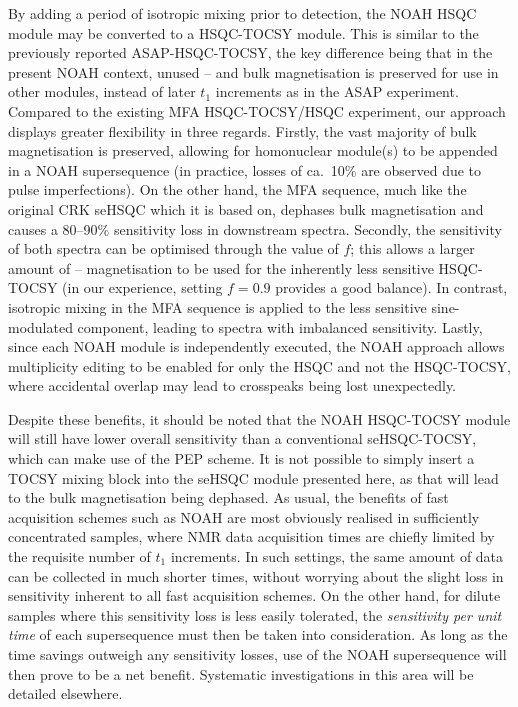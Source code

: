 \documentclass[11pt]{article}
\newcommand*{\carbon}{\ce{^{13}C}}
\newcommand*{\proton}{\ce{^{1}H}}
\begin{document}
By adding a period of isotropic mixing prior to detection, the NOAH HSQC module may be converted to a HSQC-TOCSY module.
This is similar to the previously reported ASAP-HSQC-TOCSY,\autocite{Becker2019JMR} the key difference being that in the present NOAH context, unused \carbon{}--\proton{} and bulk magnetisation is preserved for use in other modules, instead of later $t_1$ increments as in the ASAP experiment.
Compared to the existing MFA HSQC-TOCSY/HSQC experiment,\autocite{Nolis2019CPC} our approach displays greater flexibility in three regards.
Firstly, the vast majority of bulk magnetisation is preserved, allowing for homonuclear module(s) to be appended in a NOAH supersequence (in practice, losses of ca.\ 10\% are observed due to pulse imperfections).
On the other hand, the MFA sequence, much like the original CRK seHSQC which it is based on, dephases bulk magnetisation and causes a 80--90\% sensitivity loss in downstream spectra.
Secondly, the sensitivity of both spectra can be optimised through the value of $f$; this allows a larger amount of \carbon{}--\proton{} magnetisation to be used for the inherently less sensitive HSQC-TOCSY (in our experience, setting $f = 0.9$ provides a good balance).
In contrast, isotropic mixing in the MFA sequence is applied to the less sensitive sine-modulated component, leading to spectra with imbalanced sensitivity.
Lastly, since each NOAH module is independently executed, the NOAH approach allows multiplicity editing to be enabled for only the HSQC and not the HSQC-TOCSY, where accidental overlap may lead to crosspeaks being lost unexpectedly.

Despite these benefits, it should be noted that the NOAH HSQC-TOCSY module will still have lower overall sensitivity than a conventional seHSQC-TOCSY, which can make use of the PEP scheme.
It is not possible to simply insert a TOCSY mixing block into the seHSQC module presented here, as that will lead to the bulk magnetisation being dephased.
As usual, the benefits of fast acquisition schemes such as NOAH are most obviously realised in sufficiently concentrated samples, where NMR data acquisition times are chiefly limited by the requisite number of $t_1$ increments.
In such settings, the same amount of data can be collected in much shorter times, without worrying about the slight loss in sensitivity inherent to all fast acquisition schemes.
On the other hand, for dilute samples where this sensitivity loss is less easily tolerated, the \textit{sensitivity per unit time} of each supersequence must then be taken into consideration.
As long as the time savings outweigh any sensitivity losses, use of the NOAH supersequence will then prove to be a net benefit.
Systematic investigations in this area will be detailed elsewhere.
\end{document}
